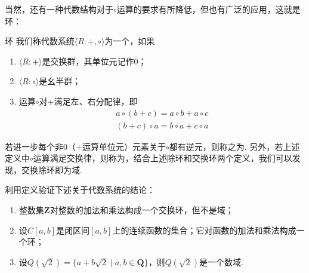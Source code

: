 当然，还有一种代数结构对于$\circ$运算的要求有所降低，但也有广泛的应用，这就是环：
\begin{definition}{环}{} 
    我们称代数系统$\langle R:+,\circ\rangle$为一个，如果
    \begin{enumerate}
        \item $\langle R:+\rangle$是交换群，其单位元记作0；

        \item $\langle R:\circ\rangle$是幺半群；

        \item 运算$\circ$对$+$满足左、右分配律，即
              \begin{gather*}
                  a\circ(b+c)=a\circ b+a\circ c \\
                  (b+c)\circ a=b\circ a+c\circ a
              \end{gather*}
    \end{enumerate}

    若进一步每个非$0$（$+$运算单位元）元素关于$\circ$都有逆元，则称之为. 另外，若上述定义中$\circ$运算满足交换律，则称为，结合上述除环和交换环两个定义，我们可以发现，交换除环即为域.
\end{definition}

\begin{example}{}{}
    利用定义验证下述关于代数系统的结论：
    \begin{enumerate}
        \item 整数集$\mathbf{Z}$对整数的加法和乘法构成一个交换环，但不是域；

        \item 设$C[a,b]$是闭区间$[a,b]$上的连续函数的集合；它对函数的加法和乘法构成一个环；

        \item 设$Q(\sqrt{2})=\{a+b\sqrt{2} \mid a,b\in\mathbf{Q}\}$，则$Q(\sqrt{2})$是一个数域.
    \end{enumerate}
\end{example}

